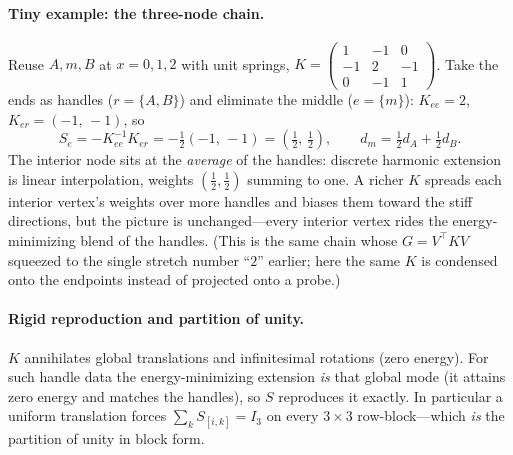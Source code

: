 \paragraph{Tiny example: the three-node chain.}
Reuse $A,m,B$ at $x=0,1,2$ with unit springs, $K=\left(\begin{smallmatrix}1&-1&0\\-1&2&-1\\0&-1&1\end{smallmatrix}\right)$.
Take the ends as handles ($r=\{A,B\}$) and eliminate the middle ($e=\{m\}$): $K_{ee}=2$, $K_{er}=(-1,\,-1)$, so
\begin{equation}
  S_e=-K_{ee}^{-1}K_{er}=-\tfrac12(-1,\,-1)=(\tfrac12,\,\tfrac12),
  \qquad d_m=\tfrac12 d_A+\tfrac12 d_B.
\end{equation}
The interior node sits at the \emph{average} of the handles: discrete harmonic extension is linear interpolation, weights $(\tfrac12,\tfrac12)$ summing to one.
A richer $K$ spreads each interior vertex's weights over more handles and biases them toward the stiff directions, but the picture is unchanged---every interior vertex rides the energy-minimizing blend of the handles.
(This is the same chain whose $G=V^\top KV$ squeezed to the single stretch number ``$2$'' earlier; here the same $K$ is condensed onto the endpoints instead of projected onto a probe.)

\paragraph{Rigid reproduction and partition of unity.}
$K$ annihilates global translations and infinitesimal rotations (zero energy).
For such handle data the energy-minimizing extension \emph{is} that global mode (it attains zero energy and matches the handles), so $S$ reproduces it exactly.
In particular a uniform translation forces $\sum_k S_{[i,k]}=I_3$ on every $3\times3$ row-block---which \emph{is} the partition of unity in block form.

